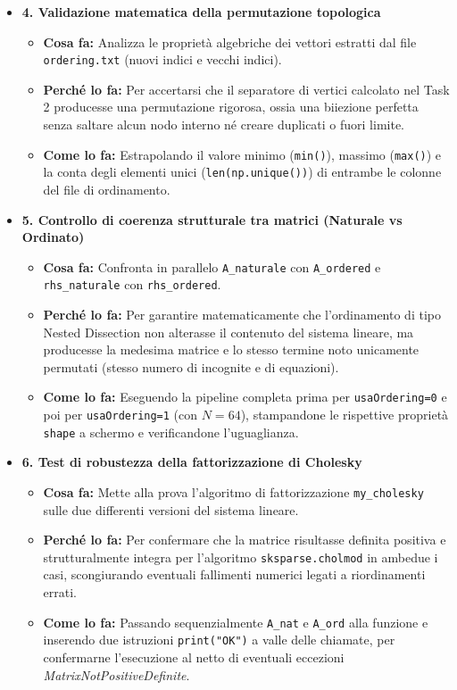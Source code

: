 \documentclass[twocolumn]{article}
\begin{document}
\begin{itemize}
    \item \textbf{4. Validazione matematica della permutazione topologica}
    \begin{itemize}
        \item \textbf{Cosa fa:} Analizza le proprietà algebriche dei vettori estratti dal file \texttt{ordering.txt} (nuovi indici e vecchi indici).
        \item \textbf{Perché lo fa:} Per accertarsi che il separatore di vertici calcolato nel Task 2 producesse una permutazione rigorosa, ossia una biiezione perfetta senza saltare alcun nodo interno né creare duplicati o fuori limite.
        \item \textbf{Come lo fa:} Estrapolando il valore minimo (\texttt{min()}), massimo (\texttt{max()}) e la conta degli elementi unici (\texttt{len(np.unique())}) di entrambe le colonne del file di ordinamento.
    \end{itemize}

    \item \textbf{5. Controllo di coerenza strutturale tra matrici (Naturale vs Ordinato)}
    \begin{itemize}
        \item \textbf{Cosa fa:} Confronta in parallelo \texttt{A\_naturale} con \texttt{A\_ordered} e \texttt{rhs\_naturale} con \texttt{rhs\_ordered}.
        \item \textbf{Perché lo fa:} Per garantire matematicamente che l'ordinamento di tipo Nested Dissection non alterasse il contenuto del sistema lineare, ma producesse la medesima matrice e lo stesso termine noto unicamente permutati (stesso numero di incognite e di equazioni).
        \item \textbf{Come lo fa:} Eseguendo la pipeline completa prima per \texttt{usaOrdering=0} e poi per \texttt{usaOrdering=1} (con $N=64$), stampandone le rispettive proprietà \texttt{shape} a schermo e verificandone l'uguaglianza.
    \end{itemize}

    \item \textbf{6. Test di robustezza della fattorizzazione di Cholesky}
    \begin{itemize}
        \item \textbf{Cosa fa:} Mette alla prova l'algoritmo di fattorizzazione \texttt{my\_cholesky} sulle due differenti versioni del sistema lineare.
        \item \textbf{Perché lo fa:} Per confermare che la matrice risultasse definita positiva e strutturalmente integra per l'algoritmo \texttt{sksparse.cholmod} in ambedue i casi, scongiurando eventuali fallimenti numerici legati a riordinamenti errati.
        \item \textbf{Come lo fa:} Passando sequenzialmente \texttt{A\_nat} e \texttt{A\_ord} alla funzione e inserendo due istruzioni \texttt{print("OK")} a valle delle chiamate, per confermarne l'esecuzione al netto di eventuali eccezioni \textit{MatrixNotPositiveDefinite}.
    \end{itemize}
\end{itemize}
\end{document}
